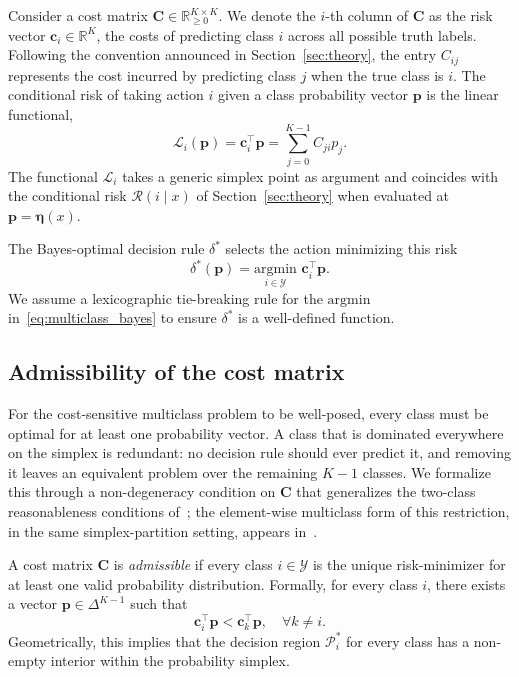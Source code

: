 Consider a cost matrix $\mathbf{C} \in \mathbb{R}_{\ge 0}^{K \times K}$. We denote the $i$-th column of $\mathbf{C}$ as the risk vector $\mathbf{c}_i \in \mathbb{R}^K$, the costs of predicting class $i$ across all possible truth labels. Following the convention announced in Section~\ref{sec:theory}, the entry $C_{ij}$ represents the cost incurred by predicting class $j$ when the true class is $i$. The conditional risk of taking action $i$ given a class probability vector $\mathbf{p}$ is the linear functional,
\begin{equation}\label{eq:linear_risk}
    \mathcal{L}_i(\mathbf{p}) = \mathbf{c}_i^\top \mathbf{p} = \sum_{j=0}^{K-1} C_{ji} p_j.
\end{equation}
The functional $\mathcal{L}_i$ takes a generic simplex point as argument and coincides with the conditional risk $\mathcal{R}(i \mid x)$ of Section~\ref{sec:theory} when evaluated at $\mathbf{p} = \boldsymbol{\eta}(x)$.

The Bayes-optimal decision rule $\delta^*$ selects the action minimizing this risk
\begin{equation}\label{eq:multiclass_bayes}
    \delta^*(\mathbf{p}) = \underset{i \in \mathcal{Y}}{\mathrm{argmin}} \,\, \mathbf{c}_i^\top \mathbf{p}.
\end{equation}
We assume a lexicographic tie-breaking rule for the $\mathrm{argmin}$ in~\eqref{eq:multiclass_bayes} to ensure $\delta^*$ is a well-defined function.

\subsection{Admissibility of the cost matrix}

For the cost-sensitive multiclass problem to be well-posed, every class must be optimal for at least one probability vector. A class that is dominated everywhere on the simplex is redundant: no decision rule should ever predict it, and removing it leaves an equivalent problem over the remaining $K-1$ classes. We formalize this through a non-degeneracy condition on $\mathbf{C}$ that generalizes the two-class reasonableness conditions of~\cite{elkan2001foundations}; the element-wise multiclass form of this restriction, in the same simplex-partition setting, appears in~\cite{obrien2008costsensitive}.

\begin{definition}\label{def:admissibility}
    A cost matrix $\mathbf{C}$ is \emph{admissible} if every class $i \in \mathcal{Y}$ is the unique risk-minimizer for at least one valid probability distribution. Formally, for every class $i$, there exists a vector $\mathbf{p} \in \Delta^{K-1}$ such that
    \begin{equation}
        \mathbf{c}_i^\top \mathbf{p} < \mathbf{c}_k^\top \mathbf{p}, \quad \forall k \neq i.
    \end{equation}
    Geometrically, this implies that the decision region $\mathcal{P}_i^*$ for every class has a non-empty interior within the probability simplex.
\end{definition}

